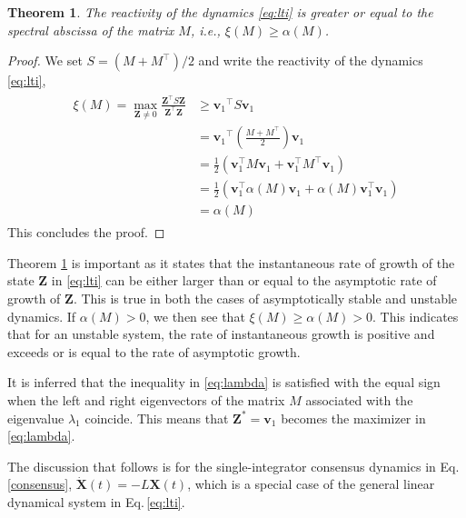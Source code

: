 \documentclass[%
 reprint,
 amsmath,amssymb,
 aip,
]{revtex4-2}
\def \bX {\pmb{X}}
\def \bZ {\pmb{Z}}
\def \bv {\pmb{v}}
\theoremstyle{italichead}
\newtheorem{theorem}{Theorem}
\theoremstyle{definition}
\begin{document}
{\begin{theorem} \label{theo}
    The reactivity of the dynamics \eqref{eq:lti} is greater or equal to the spectral abscissa of the matrix $M$, i.e., $\xi(M) \geq \alpha(M)$.
\end{theorem}
\begin{proof}
We set $S = (M+M^\top)/2$ and write the reactivity of the dynamics \eqref{eq:lti},
\begin{align} \label{eq:lambda}
\begin{split}
    \xi(M) = \max_{ \bZ \neq 0} \frac{{\bZ}^\top S \bZ }{{ \bZ}^\top \bZ} & \geq { \bv_1}^\top S \bv_1 \\
    & =   { \bv_1}^\top \left(\frac{M+M^\top}{2} \right) \bv_1 \\
    & =  \frac{1}{2}(\bv_1^\top M \bv_1 + \bv_1^\top M^\top \bv_1 ) \\
    & = \frac{1}{2}(\bv_1^\top \alpha(M) \bv_1  + \alpha(M) \bv_1^\top \bv_1 ) \\
    & = \alpha(M) 
\end{split}
\end{align}
This concludes the proof. 
\end{proof}

Theorem \ref{theo} is important as it states that the instantaneous rate of growth of the state $\bZ$ in \eqref{eq:lti} can be either larger than or equal to the asymptotic rate of growth of $\bZ$. This is true in both the cases of asymptotically stable and unstable dynamics. 
If $\alpha(M)>0$, we then see that $\xi(M) \geq \alpha(M) >0$. This indicates that for an unstable system, the rate of instantaneous growth is positive and exceeds or is equal to the rate of asymptotic growth.



It is inferred that the inequality in \eqref{eq:lambda} is satisfied with the equal sign when the left and right eigenvectors of the matrix $M$ associated with the eigenvalue $\lambda_1$ coincide. 
This means that $\bZ^* =  \bv_1$ becomes the maximizer in \eqref{eq:lambda}. 



The discussion that follows is for the single-integrator consensus dynamics in Eq.\,\eqref{consensus}, $\dot{\bX}(t) = -L \bX(t)$, which is a special case of the general linear dynamical system in Eq.\,\eqref{eq:lti}.

}
\end{document}
